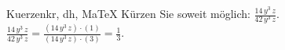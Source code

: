 \begin{MAufgabe}{Kuerzen}{kr, dh, MaTeX}
K\"urzen Sie soweit m\"oglich: $\frac{14\, y^3\, z}{42\, y^3\, z}$.\\ 
\ifLsg\MLoesung
\quad $\frac{14\, y^3\, z}{42\, y^3\, z}=\frac{(14\, y^3\, z)\cdot(1)}{(14\, y^3\, z)\cdot(3)}=\frac{1}{3}$.\else\relax\fi
 \end{MAufgabe}